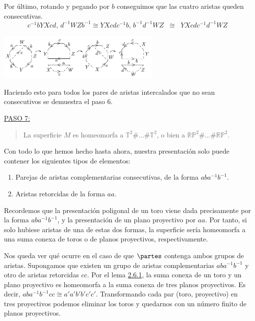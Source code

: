 {    \noindent
    Por último, rotando y pegando por $b$ conseguimos que las cuatro aristas queden consecutivas.
    \[
        c^{-1}bYXcd \text{, } d^{-1}WZb^{-1} \cong YXcdc^{-1}b \text{, } b^{-1}d^{-1}WZ \;\;\cong\;\; YXcdc^{-1}d^{-1}WZ
    \]

    \begin{center}
        \includegraphics[width=0.6\textwidth]{img/teorema-clasificacion/paso6.png}
    \end{center}

    \vspace{0.5em}
    \noindent
    Haciendo esto para todos los pares de aristas intercalados que no sean consecutivos se demuestra el paso 6.

    \vspace{1.3em}
    \noindent
    \underline{PASO 7:}
    \begin{quote}
        La superficie $M$ es homeomorfa a $\mathbb{T}^2\#\dots\#\mathbb{T}^2$, o bien a $\mathbb{RP}^2\#\dots\#\mathbb{RP}^2$.
    \end{quote}

    \noindent
    Con todo lo que hemos hecho hasta ahora, nuestra presentación solo puede contener los siguientes tipos de elementos:

    \begin{enumerate}
        \item Parejas de aristas complementarias consecutivas, de la forma $aba^{-1}b^{-1}$.
        \item Aristas retorcidas de la forma $aa$.
    \end{enumerate}

    \noindent
    Recordemos que la presentación poligonal de un toro viene dada precisamente por la forma $a b a^{-1} b^{-1}$, 
    y la presentación de un plano proyectivo por $aa$. 
    Por tanto, si solo hubiese aristas de una de estas dos formas, 
    la superficie sería homeomorfa a una suma conexa de toros o de planos proyectivos, respectivamente.

    \vspace{0.5em}
    \noindent
    Nos queda ver qué ocurre en el caso de que $\partes$ contenga ambos grupos de aristas. 
    Supongamos que existen un grupo de aristas complementarias $aba^{-1}b^{-1}$ y otro de aristas retorcidas $cc$. 
    Por el lema \hyperref[lem:toro-proyectivo]{2.6.1}, la suma conexa de un toro y un plano proyectivo es homeomorfa a la suma conexa de tres planos proyectivos. 
    Es decir, $aba^{-1}b^{-1}cc \cong a'a'b'b'c'c'$. 
    Transformando cada par (toro, proyectivo) en tres proyectivos podemos eliminar los toros y quedarnos con un número finito de planos proyectivos.

}
